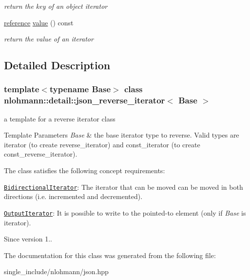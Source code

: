 \begin{DoxyCompactItemize}
\begin{DoxyCompactList}\small\item\em return the key of an object iterator \end{DoxyCompactList}\item 
\mbox{\label{classnlohmann_1_1detail_1_1json__reverse__iterator_ae22803d442d483041d17239615f83b58}} 
\hyperlink{classnlohmann_1_1detail_1_1json__reverse__iterator_a42f51a69bac7b2aebb613b2164e457f1}{reference} \hyperlink{classnlohmann_1_1detail_1_1json__reverse__iterator_ae22803d442d483041d17239615f83b58}{value} () const
\begin{DoxyCompactList}\small\item\em return the value of an iterator \end{DoxyCompactList}\end{DoxyCompactItemize}


\subsection{Detailed Description}
\subsubsection*{template$<$typename Base$>$\newline
class nlohmann\+::detail\+::json\+\_\+reverse\+\_\+iterator$<$ Base $>$}

a template for a reverse iterator class 


\begin{DoxyTemplParams}{Template Parameters}
{\em Base} & the base iterator type to reverse. Valid types are iterator (to create reverse\+\_\+iterator) and const\+\_\+iterator (to create const\+\_\+reverse\+\_\+iterator).\\
\hline
\end{DoxyTemplParams}
The class satisfies the following concept requirements\+:
\begin{DoxyItemize}
\item \href{https://en.cppreference.com/w/cpp/named_req/BidirectionalIterator}{\tt Bidirectional\+Iterator}\+: The iterator that can be moved can be moved in both directions (i.\+e. incremented and decremented).
\item \href{https://en.cppreference.com/w/cpp/named_req/OutputIterator}{\tt Output\+Iterator}\+: It is possible to write to the pointed-\/to element (only if {\itshape Base} is iterator).
\end{DoxyItemize}

\begin{DoxySince}{Since}
version 1.. 
\end{DoxySince}


The documentation for this class was generated from the following file\+:\begin{DoxyCompactItemize}
\item 
single\+\_\+include/nlohmann/json.\+hpp\end{DoxyCompactItemize}
